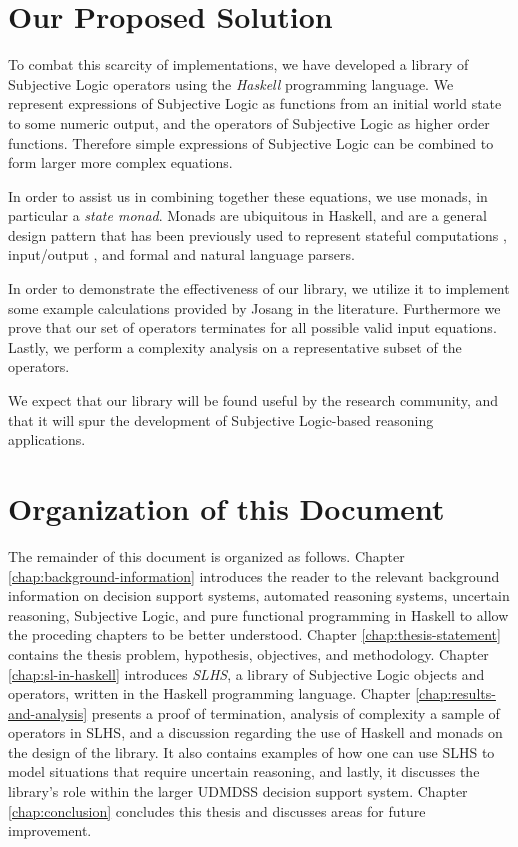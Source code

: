 \documentclass[thesis.tex]{subfiles}
\begin{document}
\section{Our Proposed Solution}

To combat this scarcity of implementations, we have developed a library of Subjective Logic
operators using the \emph{Haskell} programming language. We represent
expressions of Subjective Logic as functions from an initial world state to some
numeric output, and the operators of Subjective Logic as higher order functions.
Therefore simple expressions of Subjective Logic can be combined to form larger
more complex equations.

In order to assist us in combining together these equations, we use monads,
in particular a \emph{state monad}. Monads are ubiquitous in Haskell, and are
a general design pattern that has been previously used to represent stateful computations \cite{launchbury1994lazy},
input/output \cite{peyton1993imperative},
and formal \cite{hutton1998monadic, leijen2001parsec} and natural language
\cite{hafiz2010lazy} parsers.

In order to demonstrate the effectiveness of our library, we utilize it to implement some
example calculations provided by Josang in the literature. Furthermore we prove that our set of
operators terminates for all possible valid input equations.
Lastly, we perform a complexity analysis on a representative subset of the operators.

We expect that our library will be found useful by the research community, and that
it will spur the development of Subjective Logic-based reasoning applications.






\section{Organization of this Document}

The remainder of this document is organized as follows.
Chapter \ref{chap:background-information}
introduces the reader to the relevant background information on decision support systems,
automated reasoning systems, uncertain reasoning, Subjective Logic, and pure functional
programming in Haskell to allow the proceding
chapters to be better understood. Chapter \ref{chap:thesis-statement} contains the thesis problem, hypothesis, objectives, and methodology.
Chapter \ref{chap:sl-in-haskell} introduces \emph{SLHS}, a library of
Subjective Logic objects and operators, written in the Haskell programming language.
Chapter \ref{chap:results-and-analysis} presents a proof of termination, analysis of complexity a sample of
operators in SLHS, and a discussion regarding the use of Haskell and monads on the design of the library.
It also contains examples of how one can use SLHS to model situations
that require uncertain reasoning, and lastly, it discusses the library's role within the larger UDMDSS decision support system.
Chapter \ref{chap:conclusion} concludes this thesis and discusses areas for future improvement.
\end{document}
